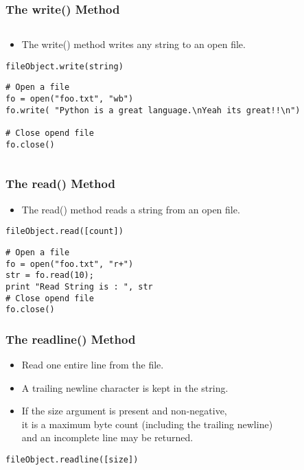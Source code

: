 \documentclass{../py-lecture}
\begin{document}
\begin{frame}[fragile]
	\frametitle{The write() Method}
	\begin{columns}[c]
		\begin{column}{30cm}
			\vspace{.1cm}
			\begin{itemize}
				\item The write() method writes any string to an open file.
			\end{itemize}
			\begin{scriptsize}
        \begin{verbatim}
fileObject.write(string)
				\end{verbatim}
        \begin{verbatim}
# Open a file
fo = open("foo.txt", "wb")
fo.write( "Python is a great language.\nYeah its great!!\n")

# Close opend file
fo.close()
				\end{verbatim}
			\end{scriptsize}
		\end{column}
	\end{columns}
\end{frame}

\begin{frame}[fragile]
	\frametitle{The read() Method}
  \begin{itemize}
    \item The read() method reads a string from an open file.
  \end{itemize}
  \begin{verbatim}
fileObject.read([count])
  \end{verbatim}
  \begin{verbatim}
# Open a file
fo = open("foo.txt", "r+")
str = fo.read(10);
print "Read String is : ", str
# Close opend file
fo.close()
	\end{verbatim}
\end{frame}

\begin{frame}[fragile]
	\frametitle{The readline() Method}
  \begin{itemize}
    \item Read one entire line from the file.
    \item A trailing newline character is kept in the string.
    \item If the size argument is present and non-negative, \\
    it is a maximum byte count (including the trailing newline) \\
    and an incomplete line may be returned.
  \end{itemize}
  \begin{verbatim}
fileObject.readline([size])
  \end{verbatim}
\end{frame}
\end{document}
